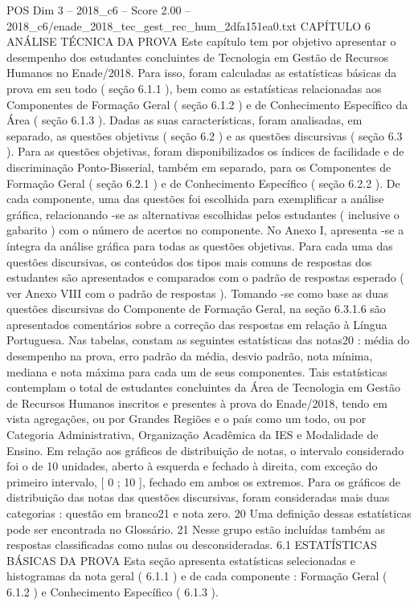 \begin{textsample}{POS Dim 3 – 2018\_c6 – Score 2.00 – 2018\_c6/enade\_2018\_tec\_gest\_rec\_hum\_2dfa151ea0.txt}  \label{ex:f3_pos_112}
CAPÍTULO 6 ANÁLISE TÉCNICA DA PROVA Este capítulo tem por objetivo apresentar o desempenho dos estudantes concluintes de Tecnologia em Gestão de Recursos Humanos no Enade/2018.
Para isso, foram calculadas as estatísticas básicas da prova em seu todo ( seção 6.1.1 ), bem como as estatísticas relacionadas aos Componentes de Formação Geral ( seção 6.1.2 ) e de Conhecimento Específico da Área ( seção 6.1.3 ).
Dadas as suas características, foram analisadas, em separado, as questões objetivas ( seção 6.2 ) e as questões discursivas ( seção 6.3 ).
Para as questões objetivas, foram disponibilizados os índices de facilidade e de discriminação Ponto-Bisserial, também em separado, para os Componentes de Formação Geral ( seção 6.2.1 ) e de Conhecimento Específico ( seção 6.2.2 ).
De cada componente, uma das questões foi escolhida para exemplificar a análise gráfica, relacionando -se as alternativas escolhidas pelos estudantes ( inclusive o gabarito ) com o número de acertos no componente.
No Anexo I, apresenta -se a íntegra da análise gráfica para todas as questões objetivas.
Para cada uma das questões discursivas, os conteúdos dos tipos mais comuns de respostas dos estudantes são apresentados e comparados com o padrão de respostas esperado ( ver Anexo VIII com o padrão de respostas ).
Tomando -se como base as duas questões discursivas do Componente de Formação Geral, na seção 6.3.1.6 são apresentados comentários sobre a correção das respostas em relação à Língua Portuguesa.
Nas tabelas, constam as seguintes estatísticas das notas20 : média do desempenho na prova, erro padrão da média, desvio padrão, nota mínima, mediana e nota máxima para cada um de seus componentes.
Tais estatísticas contemplam o total de estudantes concluintes da Área de Tecnologia em Gestão de Recursos Humanos inscritos e presentes à prova do Enade/2018, tendo em vista agregações, ou por Grandes Regiões e o país como um todo, ou por Categoria Administrativa, Organização Acadêmica da IES e Modalidade de Ensino.
Em relação aos gráficos de distribuição de notas, o intervalo considerado foi o de 10 unidades, aberto à esquerda e fechado à direita, com exceção do primeiro intervalo, [ 0 ; 10 ], fechado em ambos os extremos.
Para os gráficos de distribuição das notas das questões discursivas, foram consideradas mais duas categorias : questão em branco21 e nota zero. 20 Uma definição dessas estatísticas pode ser encontrada no Glossário. 21 Nesse grupo estão incluídas também as respostas classificadas como nulas ou desconsideradas. 6.1 ESTATÍSTICAS BÁSICAS DA PROVA Esta seção apresenta estatísticas selecionadas e histogramas da nota geral ( 6.1.1 ) e de cada componente : Formação Geral ( 6.1.2 ) e Conhecimento Específico ( 6.1.3 ).

\end{textsample}
